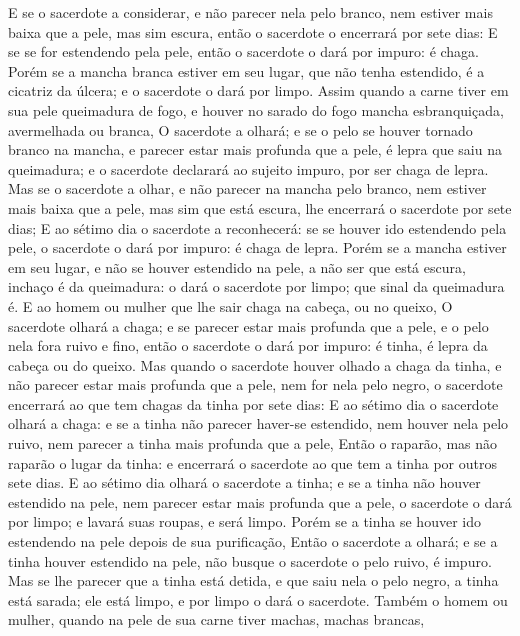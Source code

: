 {E se o sacerdote a considerar, e não parecer nela pelo branco, nem estiver mais baixa que a pele, mas sim escura, então o sacerdote o encerrará por sete dias:
E se se for estendendo pela pele, então o sacerdote o dará por impuro: é chaga.
Porém se a mancha branca estiver em seu lugar, que não tenha estendido, é a cicatriz da úlcera; e o sacerdote o dará por limpo.
Assim quando a carne tiver em sua pele queimadura de fogo, e houver no sarado do fogo mancha esbranquiçada, avermelhada ou branca,
O sacerdote a olhará; e se o pelo se houver tornado branco na mancha, e parecer estar mais profunda que a pele, é lepra que saiu na queimadura; e o sacerdote declarará ao sujeito impuro, por ser chaga de lepra.
Mas se o sacerdote a olhar, e não parecer na mancha pelo branco, nem estiver mais baixa que a pele, mas sim que está escura, lhe encerrará o sacerdote por sete dias;
E ao sétimo dia o sacerdote a reconhecerá: se se houver ido estendendo pela pele, o sacerdote o dará por impuro: é chaga de lepra.
Porém se a mancha estiver em seu lugar, e não se houver estendido na pele, a não ser que está escura, inchaço é da queimadura: o dará o sacerdote por limpo; que sinal da queimadura é.
E ao homem ou mulher que lhe sair chaga na cabeça, ou no queixo,
O sacerdote olhará a chaga; e se parecer estar mais profunda que a pele, e o pelo nela fora ruivo e fino, então o sacerdote o dará por impuro: é tinha, é lepra da cabeça ou do queixo.
Mas quando o sacerdote houver olhado a chaga da tinha, e não parecer estar mais profunda que a pele, nem for nela pelo negro, o sacerdote encerrará ao que tem chagas da tinha por sete dias:
E ao sétimo dia o sacerdote olhará a chaga: e se a tinha não parecer haver-se estendido, nem houver nela pelo ruivo, nem parecer a tinha mais profunda que a pele,
Então o raparão, mas não raparão o lugar da tinha: e encerrará o sacerdote ao que tem a tinha por outros sete dias.
E ao sétimo dia olhará o sacerdote a tinha; e se a tinha não houver estendido na pele, nem parecer estar mais profunda que a pele, o sacerdote o dará por limpo; e lavará suas roupas, e será limpo.
Porém se a tinha se houver ido estendendo na pele depois de sua purificação,
Então o sacerdote a olhará; e se a tinha houver estendido na pele, não busque o sacerdote o pelo ruivo, é impuro.
Mas se lhe parecer que a tinha está detida, e que saiu nela o pelo negro, a tinha está sarada; ele está limpo, e por limpo o dará o sacerdote.
Também o homem ou mulher, quando na pele de sua carne tiver machas, machas brancas,
}
